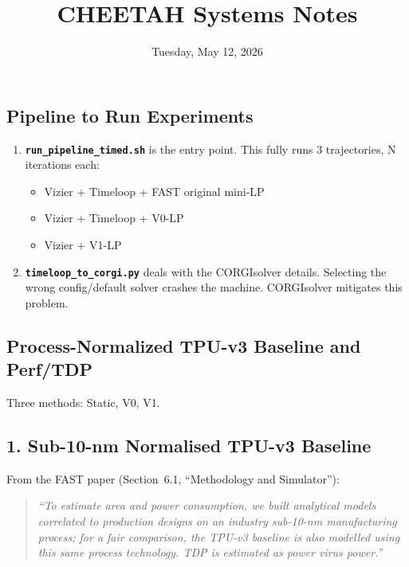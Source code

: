 \documentclass[11pt,a4paper]{article}
\newcommand{\ic}[1]{\texttt{#1}}
\begin{document}
\title{CHEETAH Systems Notes}
\author{}
\date{Tuesday, May 12, 2026}
\maketitle
\subsection{Pipeline to Run Experiments}

\begin{enumerate}
  \item \textbf{\ic{run\_pipeline\_timed.sh}} is the entry point. This fully
        runs 3 trajectories, N iterations each:
        \begin{itemize}[noitemsep]
          \item Vizier + Timeloop + FAST original mini-LP
          \item Vizier + Timeloop + V0-LP
          \item Vizier + V1-LP
        \end{itemize}

  \item \textbf{\ic{timeloop\_to\_corgi.py}} deals with the CORGIsolver details. Selecting the wrong config/default solver crashes the machine. CORGIsolver mitigates this problem.
\end{enumerate}

\subsection{Process-Normalized TPU-v3 Baseline and Perf/TDP}

Three methods: Static, V0, V1.

\subsection{1. Sub-10-nm Normalised TPU-v3 Baseline}

From the FAST paper (Section~6.1, ``Methodology and Simulator''):

\begin{quote}
\textit{``To estimate area and power consumption, we built analytical models
correlated to production designs on an industry sub-10-nm manufacturing
process; for a fair comparison, the TPU-v3 baseline is also modelled using this
same process technology. TDP is estimated as power virus power.''}
\end{quote}
\end{document}
